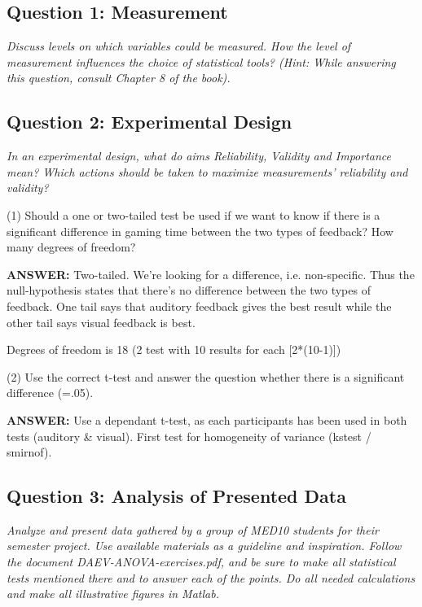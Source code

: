\subsection{Question 1: Measurement}
\textit{Discuss levels on which variables could be measured. How the level of measurement influences the choice of statistical tools? (Hint: While answering this question, consult Chapter 8 of the book).}

\subsection{Question 2: Experimental Design}
\textit{In an experimental design, what do aims Reliability, Validity and Importance mean? Which actions should be taken to maximize measurements' reliability and validity?}

(1) Should a one or two-tailed test be used if we want to know if there is a significant difference in gaming time between the two types of feedback? How many degrees of freedom?

\textbf{ANSWER:} Two-tailed. We're looking for a difference, i.e. non-specific. Thus the null-hypothesis states that there's no difference between the two types of feedback. One tail says that auditory feedback gives the best result while the other tail says visual feedback is best.

Degrees of freedom is 18 (2 test with 10 results for each [2*(10-1)])

(2) Use the correct t-test and answer the question whether there is a significant difference (=.05).

\textbf{ANSWER:} Use a dependant t-test, as each participants has been used in both tests (auditory & visual). First test for homogeneity of variance (kstest / smirnof).

\subsection{Question 3: Analysis of Presented Data}
\textit{Analyze and present data gathered by a group of MED10 students for their semester project. Use available materials as a guideline and inspiration. Follow the document DAEV-ANOVA-exercises.pdf, and be sure to make all statistical tests mentioned there and to answer each of the points. Do all needed calculations and make all illustrative figures in Matlab.}